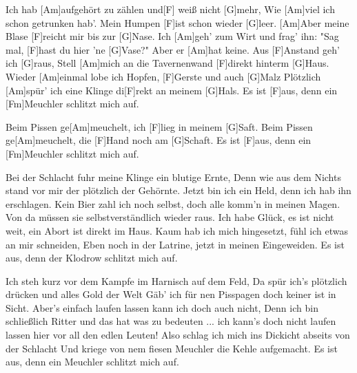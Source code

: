 

\vspace{-0.3em}
\begin{guitar}
	\vspace*{-0.1em}
	Ich hab [Am]aufgehört zu zählen und[F] weiß nicht [G]mehr,
	Wie [Am]viel ich schon getrunken hab'. Mein Humpen [F]ist schon wieder [G]leer.
	[Am]Aber meine Blase [F]reicht mir bis zur [G]Nase.
	Ich [Am]geh' zum Wirt und frag' ihn: "Sag mal, [F]hast du hier 'ne [G]Vase?"
	Aber er [Am]hat keine. Aus [F]Anstand geh' ich [G]raus,
	Stell [Am]mich an die Tavernenwand [F]direkt hinterm [G]Haus.
	Wieder [Am]einmal lobe ich Hopfen, [F]Gerste und auch [G]Malz
	Plötzlich [Am]spür' ich eine Klinge di[F]rekt an meinem [G]Hals.
	Es ist [F]aus, denn ein [Fm]Meuchler schlitzt mich auf.
	
	\vspace*{-0.1em}
	Beim Pissen ge[Am]meuchelt, ich [F]lieg in meinem [G]Saft.
	Beim Pissen ge[Am]meuchelt, die [F]Hand noch am [G]Schaft.
	Es ist [F]aus, denn ein [Fm]Meuchler schlitzt mich auf.
	 
	\vspace*{-0.1em}\footnotesize{}
	Bei der Schlacht fuhr meine Klinge ein blutige Ernte,
	Denn wie aus dem Nichts stand vor mir der plötzlich der Gehörnte.
	Jetzt bin ich ein Held, denn ich hab ihn erschlagen.
	Kein Bier zahl ich noch selbst, doch alle komm’n in meinen Magen.
	Von da müssen sie selbstverständlich wieder raus.
	Ich habe Glück, es ist nicht weit, ein Abort ist direkt im Haus.
	Kaum hab ich mich hingesetzt, fühl ich etwas an mir schneiden,
	Eben noch in der Latrine, jetzt in meinen Eingeweiden.
	Es ist aus, denn der Klodrow schlitzt mich auf.
	
	\vspace*{-0.1em} 
	
	\vspace*{-0.1em}
	Ich steh kurz vor dem Kampfe im Harnisch auf dem Feld,
	Da spür ich’s plötzlich drücken und alles Gold der Welt
	Gäb’ ich für nen Pisspagen doch keiner ist in Sicht.
	Aber’s einfach laufen lassen kann ich doch auch nicht,
	Denn ich bin schließlich Ritter und das hat was zu bedeuten
	... ich kann’s doch nicht laufen lassen hier vor all den edlen Leuten!
	Also schlag ich mich ins Dickicht abseits von der Schlacht
	Und kriege von nem fiesen Meuchler die Kehle aufgemacht.
	Es ist aus, denn ein Meuchler schlitzt mich auf.
	

\end{guitar}
